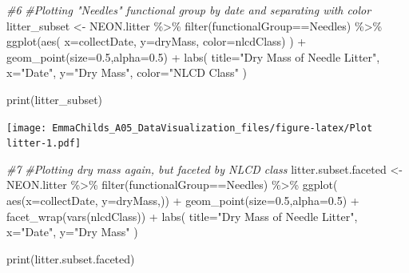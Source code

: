 \documentclass[
]{article}
\newenvironment{Shaded}{\begin{snugshade}}{\end{snugshade}}
\newcommand{\AttributeTok}[1]{\textcolor[rgb]{0.77,0.63,0.00}{#1}}
\newcommand{\CommentTok}[1]{\textcolor[rgb]{0.56,0.35,0.01}{\textit{#1}}}
\newcommand{\FloatTok}[1]{\textcolor[rgb]{0.00,0.00,0.81}{#1}}
\newcommand{\FunctionTok}[1]{\textcolor[rgb]{0.00,0.00,0.00}{#1}}
\newcommand{\NormalTok}[1]{#1}
\newcommand{\OtherTok}[1]{\textcolor[rgb]{0.56,0.35,0.01}{#1}}
\newcommand{\SpecialCharTok}[1]{\textcolor[rgb]{0.00,0.00,0.00}{#1}}
\newcommand{\StringTok}[1]{\textcolor[rgb]{0.31,0.60,0.02}{#1}}
\begin{document}
\begin{Shaded}
\begin{Highlighting}[]
\CommentTok{\#6}
\CommentTok{\#Plotting "Needles" functional group by date and separating with color}
\NormalTok{litter\_subset }\OtherTok{\textless{}{-}}\NormalTok{ NEON.litter }\SpecialCharTok{\%\textgreater{}\%} 
  \FunctionTok{filter}\NormalTok{(functionalGroup}\SpecialCharTok{==}\StringTok{\textquotesingle{}Needles\textquotesingle{}}\NormalTok{) }\SpecialCharTok{\%\textgreater{}\%} 
  \FunctionTok{ggplot}\NormalTok{(}\FunctionTok{aes}\NormalTok{(}
      \AttributeTok{x=}\NormalTok{collectDate,}
      \AttributeTok{y=}\NormalTok{dryMass,}
      \AttributeTok{color=}\NormalTok{nlcdClass)}
\NormalTok{    ) }\SpecialCharTok{+} 
  \FunctionTok{geom\_point}\NormalTok{(}\AttributeTok{size=}\FloatTok{0.5}\NormalTok{,}\AttributeTok{alpha=}\FloatTok{0.5}\NormalTok{) }\SpecialCharTok{+}
    \FunctionTok{labs}\NormalTok{(}
    \AttributeTok{title=}\StringTok{"Dry Mass of Needle Litter"}\NormalTok{,}
    \AttributeTok{x=}\StringTok{"Date"}\NormalTok{,}
    \AttributeTok{y=}\StringTok{"Dry Mass"}\NormalTok{,}
    \AttributeTok{color=}\StringTok{"NLCD Class"}
\NormalTok{    )}

\FunctionTok{print}\NormalTok{(litter\_subset)}
\end{Highlighting}
\end{Shaded}

\texttt{[image: EmmaChilds\_A05\_DataVisualization\_files/figure-latex/Plot litter-1.pdf]}

\begin{Shaded}
\begin{Highlighting}[]
\CommentTok{\#7}
\CommentTok{\#Plotting dry mass again, but faceted by NLCD class}
\NormalTok{litter.subset.faceted }\OtherTok{\textless{}{-}}\NormalTok{ NEON.litter }\SpecialCharTok{\%\textgreater{}\%}
  \FunctionTok{filter}\NormalTok{(functionalGroup}\SpecialCharTok{==}\StringTok{\textquotesingle{}Needles\textquotesingle{}}\NormalTok{) }\SpecialCharTok{\%\textgreater{}\%} 
  \FunctionTok{ggplot}\NormalTok{(}
     \FunctionTok{aes}\NormalTok{(}\AttributeTok{x=}\NormalTok{collectDate, }
         \AttributeTok{y=}\NormalTok{dryMass,)) }\SpecialCharTok{+}
  \FunctionTok{geom\_point}\NormalTok{(}\AttributeTok{size=}\FloatTok{0.5}\NormalTok{,}\AttributeTok{alpha=}\FloatTok{0.5}\NormalTok{) }\SpecialCharTok{+}
  \FunctionTok{facet\_wrap}\NormalTok{(}\FunctionTok{vars}\NormalTok{(nlcdClass)) }\SpecialCharTok{+}
    \FunctionTok{labs}\NormalTok{(}
    \AttributeTok{title=}\StringTok{"Dry Mass of Needle Litter"}\NormalTok{,}
    \AttributeTok{x=}\StringTok{"Date"}\NormalTok{,}
    \AttributeTok{y=}\StringTok{"Dry Mass"}
\NormalTok{    )}

\FunctionTok{print}\NormalTok{(litter.subset.faceted)}
\end{Highlighting}
\end{Shaded}
\end{document}
